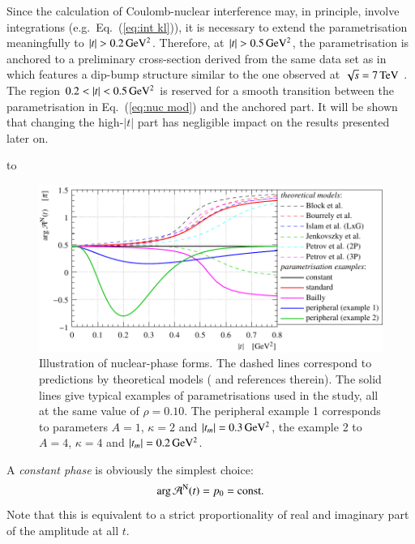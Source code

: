 Since the calculation of Coulomb-nuclear interference may, in principle, involve integrations (e.g.~Eq.~(\ref{eq:int kl})), it is necessary to extend the parametrisation meaningfully to $|t| > 0.2\,{\rm GeV^2}$. Therefore, at $|t| > 0.5\,{\rm GeV^2}$, the parametrisation is anchored to a preliminary cross-section derived from the same data set as in \cite{8tev-90m} which features a dip-bump structure similar to the one observed at $\sqrt{s} = 7\,{\rm TeV}$ \cite{epl95}. The region $0.2 < |t| < 0.5\,{\rm GeV^2}$ is reserved for a smooth transition between the parametrisation in Eq.~(\ref{eq:nuc mod}) and the anchored part. It will be shown that changing the high-$|t|$ part has negligible impact on the results presented later on.


\vskip3mm
\hbox to

\begin{figure}
\begin{center}
\includegraphics{fig/hadronic_phase_illustration.pdf}
\caption{Illustration of nuclear-phase forms. The dashed lines correspond to predictions by theoretical models (\cite{elegent} and references therein). The solid lines give typical examples of parametrisations used in the study, all at the same value of $\rho = 0.10$. The peripheral example 1 corresponds to parameters $A = 1$, $\kappa = 2$ and $|t_m| = 0.3\,{\rm GeV^2}$, the example 2 to $A = 4$, $\kappa = 4$ and $|t_m| = 0.2\,{\rm GeV^2}$.
}
\label{fig:phase illustration}
\end{center}
\end{figure}


A {\it constant phase} is obviously the simplest choice:
\begin{equation}
\label{eq:nuc phase con}
\arg {\cal A}^{\rm N}(t) = p_0 = \hbox{const.}
\end{equation}
Note that this is equivalent to a strict proportionality of real and imaginary part of the amplitude at all $t$.

